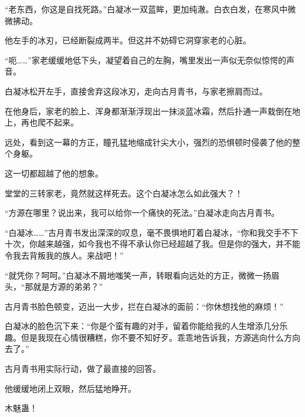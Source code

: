 \begin{this_body}
“老东西，你这是自找死路。”白凝冰一双蓝眸，更加纯澈。白衣白发，在寒风中微微拂动。

他左手的冰刃，已经断裂成两半。但这并不妨碍它洞穿家老的心脏。

“呃……”家老缓缓地低下头，凝望着自己的左胸，嘴里发出一声似无奈似惊愕的声音。

白凝冰松开左手，直接舍弃这段冰刃，走向古月青书，与家老擦肩而过。

在他身后，家老的脸上、浑身都渐渐浮现出一抹淡蓝冰霜，然后扑通一声栽倒在地上，再也爬不起来。

远处，看到这一幕的方正，瞳孔猛地缩成针尖大小，强烈的恐惧顿时侵袭了他的整个身躯。

这一切都超越了他的想象。

堂堂的三转家老，竟然就这样死去。这个白凝冰怎么如此强大？！

“方源在哪里？说出来，我可以给你一个痛快的死法。”白凝冰走向古月青书。

“白凝冰……”古月青书发出深深的叹息，毫不畏惧地盯着白凝冰，“你和我交手不下十次，你越来越强，如今我也不得不承认你已经超越了我。但是你的强大，并不能令我去背叛我的族人。来战吧！”

“就凭你？呵呵。”白凝冰不屑地嗤笑一声，转眼看向远处的方正，微微一扬眉头，“那就是方源的弟弟？”

古月青书脸色顿变，迈出一大步，拦在白凝冰的面前：“你休想找他的麻烦！”

白凝冰的脸色沉下来：“你是个蛮有趣的对手，留着你能给我的人生增添几分乐趣。但是我现在心情很糟糕，你不要不知好歹。乖乖地告诉我，方源逃向什么方向去了。”

古月青书用实际行动，做了最直接的回答。

他缓缓地闭上双眼，然后猛地睁开。

木魅蛊！

\end{this_body}

